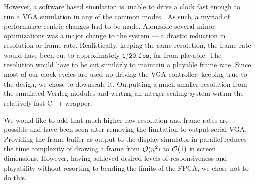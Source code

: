 However, a software based simulation is unable to drive a clock fast enough
to run a VGA simulation in any of the common modes \cite{vga_modes}. As such,
a myriad of performance-centric changes had to be made. Alongside several
minor optimizations was a major change to the system --- a drastic reduction in
resolution or frame rate. Realistically, keeping the same resolution, the frame 
rate would have been cut to approximately \(\texttt{1/20 fps}\), far from playable.
The resolution would have to be cut similarly to maintain a playable frame rate.
Since most of our clock cycles are used up driving the VGA controller, keeping true
to the design, we chose to downscale it. Outputting a much smaller resolution from
the simulated Verilog modules and writing an integer scaling \cite{intscale} system
within the relatively fast C++ wrapper. 

We would like to add that much higher raw resolution and frame rates are possible 
and have been seen after removing the limitation to output serial VGA. Providing
the frame buffer as output to the display simulator in parallel reduces the time
complexity of drawing a frame from \(\mathcal{O} (n^2)\) to \(\mathcal{O} (1)\) in screen 
dimensions. However, having achieved desired levels of responsiveness and 
playability without resorting to bending the limits of the FPGA, we chose not 
to do this.